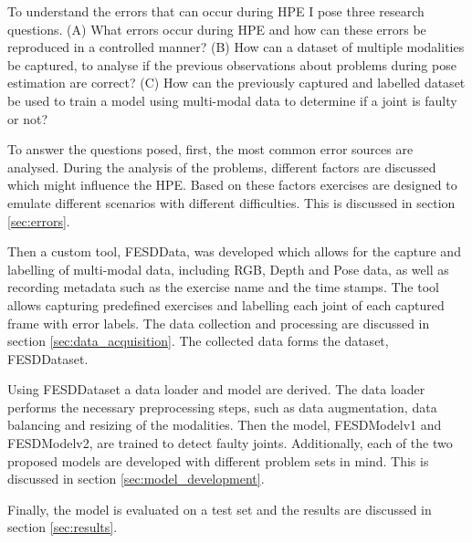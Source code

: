 To understand the errors that can occur during HPE I pose three research questions. (A) What errors occur during HPE and how can these errors be reproduced in a controlled manner? (B) How can a dataset of multiple modalities be captured, to analyse if the previous observations about problems during pose estimation are correct? (C) How can the previously captured and labelled dataset be used to train a model using multi-modal data to determine if a joint is faulty or not? 

To answer the questions posed, first, the most common error sources are analysed. During the analysis of the problems, different factors are discussed which might influence the HPE. Based on these factors exercises are designed to emulate different scenarios with different difficulties. This is discussed in section \ref{sec:errors}.

Then a custom tool, FESDData, was developed which allows for the capture and labelling of multi-modal data, including RGB, Depth and Pose data, as well as recording metadata such as the exercise name and the time stamps. The tool allows capturing predefined exercises and labelling each joint of each captured frame with error labels. The data collection and processing are discussed in section \ref{sec:data_acquisition}. The collected data forms the dataset, FESDDataset.

Using FESDDataset a data loader and model are derived. The data loader performs the necessary preprocessing steps, such as data augmentation, data balancing and resizing of the modalities. Then the model, FESDModelv1 and FESDModelv2, are trained to detect faulty joints. Additionally, each of the two proposed models are developed with different problem sets in mind. This is discussed in section \ref{sec:model_development}.

Finally, the model is evaluated on a test set and the results are discussed in section \ref{sec:results}.